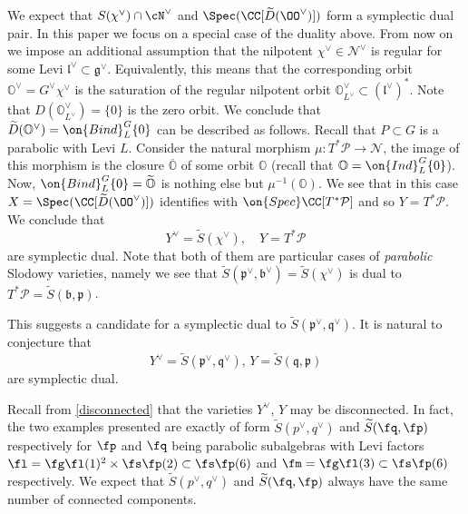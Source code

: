 \documentclass[12pt]{amsart}
\begin{document}
    We expect that $S(\chi^\vee)\cap \cN^\vee$ and $\Spec(\CC[\widetilde{D}(\OO^\vee)])$ form a symplectic dual pair. In this paper we focus on a special case of the duality above. From now on we impose an additional assumption that the nilpotent $\chi^\vee \in \mathcal{N}^\vee$ is regular for some Levi $\mathfrak{l}^\vee \subset \mathfrak{g}^\vee$. Equivalently, this means that the corresponding orbit $\mathbb{O}^\vee = G^\vee \chi^\vee$ is the saturation of the regular nilpotent orbit $\mathbb{O}^\vee_{L^{\vee}} \subset (\mathfrak{l}^{\vee})^*$. Note that $D(\mathbb{O}^\vee_{L^\vee})=\{0\}$ is the zero orbit. We conclude that $\widetilde{D}(\mathbb{O}^\vee)=\on{Bind}_{L}^{G}\{0\}$ can be described as follows. Recall that $P \subset G$ is a parabolic with Levi $L$. Consider the natural morphism $\mu\colon T^*\mathcal{P} \rightarrow \mathcal{N}$, the image of this morphism is the closure $\overline{\mathbb{O}}$ of some orbit $\mathbb{O}$ (recall that $\mathbb{O}=\on{Ind}_L^G \{0\}$). Now, $\on{Bind}_{L}^{G}\{0\}=\widetilde{\mathbb{O}}$ is nothing else but $\mu^{-1}(\mathbb{O})$.  We see that in this case $X=\Spec(\CC[\widetilde{D}(\OO^\vee)])$ identifies with $\on{Spec}\CC[T^*\mathcal{P}]$ and so $Y=T^*\mathcal{P}$. We conclude that 
\begin{equation*}
Y^\vee=\widetilde{S}(\chi^\vee),\quad Y=T^*\mathcal{P}
\end{equation*}
are symplectic dual. Note that both of them are particular cases of {\emph{parabolic}} Slodowy varieties, namely we see that $\widetilde{S}(\mathfrak{p}^\vee,\mathfrak{b}^\vee)=\widetilde{S}(\chi^\vee)$ is dual to $T^*\mathcal{P}=\widetilde{S}(\mathfrak{b},\mathfrak{p})$.


This suggests a candidate for a symplectic dual to $\widetilde{S}(\mathfrak{p}^\vee,\mathfrak{q}^\vee)$. It is natural to conjecture that 
\begin{equation*}
Y^\vee=\widetilde{S}(\mathfrak{p}^\vee,\mathfrak{q}^\vee),\, Y=\widetilde{S}(\mathfrak{q},\mathfrak{p})
\end{equation*}
are symplectic dual.

\begin{rmk}\label{disconnected together}
    Recall from \cref{disconnected} that the varieties $Y^\vee$, $Y$ may be disconnected. In fact, the two examples presented are exactly of form $\widetilde{S}(p^\vee, q^\vee)$ and $\widetilde{S}(\fq, \fp)$ respectively for $\fp$ and $\fq$ being parabolic subalgebras with Levi factors $\fl=\fg\fl(1)^2\times \fs\fp(2) \subset \fs\fp(6)$ and $\fm=\fg\fl(3)\subset \fs\fp(6)$ respectively. We expect that $\widetilde{S}(p^\vee, q^\vee)$ and $\widetilde{S}(\fq, \fp)$ always have the same number of connected components.
\end{rmk}
\end{document}
